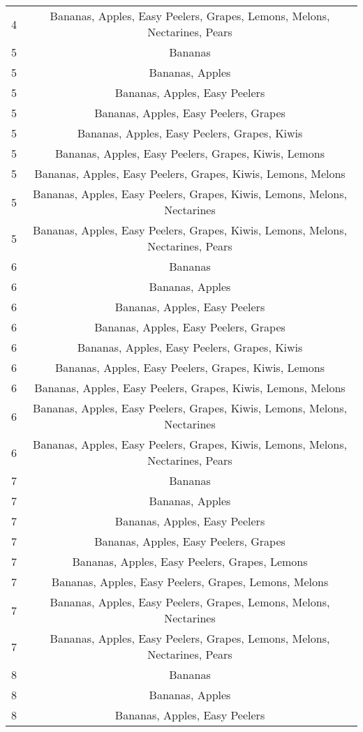 \documentclass[11pt]{article}
\begin{document}
\begin{table}[h]
\begin{center}
\begin{tabular}{lc}
4 & Bananas, Apples, Easy Peelers, Grapes, Lemons, Melons, Nectarines, Pears \\
5 & Bananas \\
5 & Bananas, Apples \\
5 & Bananas, Apples, Easy Peelers \\
5 & Bananas, Apples, Easy Peelers, Grapes \\
5 & Bananas, Apples, Easy Peelers, Grapes, Kiwis \\
5 & Bananas, Apples, Easy Peelers, Grapes, Kiwis, Lemons \\
5 & Bananas, Apples, Easy Peelers, Grapes, Kiwis, Lemons, Melons \\
5 & Bananas, Apples, Easy Peelers, Grapes, Kiwis, Lemons, Melons, Nectarines \\
5 & Bananas, Apples, Easy Peelers, Grapes, Kiwis, Lemons, Melons, Nectarines, Pears \\
6 & Bananas \\
6 & Bananas, Apples \\
6 & Bananas, Apples, Easy Peelers \\
6 & Bananas, Apples, Easy Peelers, Grapes \\
6 & Bananas, Apples, Easy Peelers, Grapes, Kiwis \\
6 & Bananas, Apples, Easy Peelers, Grapes, Kiwis, Lemons \\
6 & Bananas, Apples, Easy Peelers, Grapes, Kiwis, Lemons, Melons \\
6 & Bananas, Apples, Easy Peelers, Grapes, Kiwis, Lemons, Melons, Nectarines \\
6 & Bananas, Apples, Easy Peelers, Grapes, Kiwis, Lemons, Melons, Nectarines, Pears \\
7 & Bananas \\
7 & Bananas, Apples \\
7 & Bananas, Apples, Easy Peelers \\
7 & Bananas, Apples, Easy Peelers, Grapes \\
7 & Bananas, Apples, Easy Peelers, Grapes, Lemons \\
7 & Bananas, Apples, Easy Peelers, Grapes, Lemons, Melons \\
7 & Bananas, Apples, Easy Peelers, Grapes, Lemons, Melons, Nectarines \\
7 & Bananas, Apples, Easy Peelers, Grapes, Lemons, Melons, Nectarines, Pears \\
8 & Bananas \\
8 & Bananas, Apples \\
8 & Bananas, Apples, Easy Peelers \\

\end{tabular}
\end{center}
\end{table}
\end{document}
